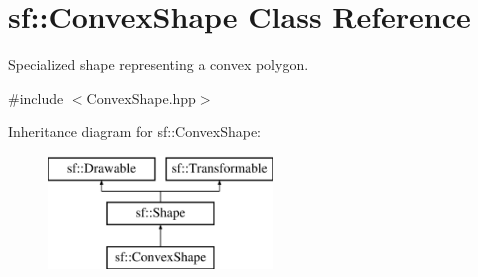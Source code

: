\hypertarget{classsf_1_1ConvexShape}{\section{sf\-:\-:Convex\-Shape Class Reference}
\label{classsf_1_1ConvexShape}
}


Specialized shape representing a convex polygon.  




{\ttfamily \#include $<$Convex\-Shape.\-hpp$>$}

Inheritance diagram for sf\-:\-:Convex\-Shape\-:\begin{figure}[H]
\begin{center}
\leavevmode
\includegraphics[height=3.000000cm]{classsf_1_1ConvexShape}
\end{center}
\end{figure}
